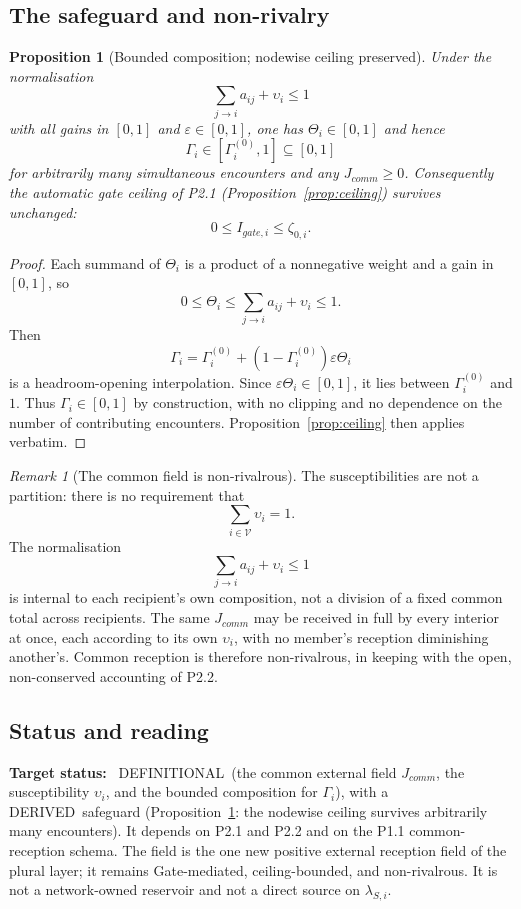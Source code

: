 \documentclass[11pt,a4paper]{article}
\def\mathrm#1{#1}%
\def\emph#1{#1}%
\newcommand{\stDerived}{\textcolor{cDer}{\textsf{\small DERIVED}}}
\newcommand{\stDef}{\textcolor{cDef}{\textsf{\small DEFINITIONAL}}}
\theoremstyle{definition}
\theoremstyle{plain}
\newtheorem{proposition}[definition]{Proposition}
\theoremstyle{remark}
\newtheorem{remark}[definition]{Remark}
\begin{document}
\subsection{The safeguard and non-rivalry}

\begin{proposition}[Bounded composition; nodewise ceiling preserved]\label{prop:safeguard}
Under the normalisation
\[
\sum_{j\to i}a_{ij}+\upsilon_i\le1
\]
with all gains in \([0,1]\) and \(\varepsilon\in[0,1]\), one has
\(\Theta_i\in[0,1]\) and hence
\[
\Gamma_i\in[\Gamma_i^{(0)},1]\subseteq[0,1]
\]
for arbitrarily many simultaneous encounters and any
\(J_{\mathrm{comm}}\ge0\). Consequently the automatic gate ceiling of P2.1
(Proposition~\ref{prop:ceiling}) survives unchanged:
\[
0\le I_{\mathrm{gate},i}\le\zeta_{0,i}.
\]
\end{proposition}

\begin{proof}
Each summand of \(\Theta_i\) is a product of a nonnegative weight and a gain in
\([0,1]\), so
\[
0\le\Theta_i\le\sum_{j\to i}a_{ij}+\upsilon_i\le1.
\]
Then
\[
\Gamma_i
=
\Gamma_i^{(0)}+(1-\Gamma_i^{(0)})\varepsilon\Theta_i
\]
is a headroom-opening interpolation. Since \(\varepsilon\Theta_i\in[0,1]\), it lies
between \(\Gamma_i^{(0)}\) and \(1\). Thus \(\Gamma_i\in[0,1]\) by construction,
with no clipping and no dependence on the number of contributing encounters.
Proposition~\ref{prop:ceiling} then applies verbatim. \qedhere
\end{proof}

\begin{remark}[The common field is non-rivalrous]\label{rem:nonrival}
The susceptibilities are \emph{not} a partition: there is no requirement that
\[
\sum_{i\in\mathcal V}\upsilon_i=1.
\]
The normalisation
\[
\sum_{j\to i}a_{ij}+\upsilon_i\le1
\]
is internal to each recipient's own composition, not a division of a fixed common
total across recipients. The same \(J_{\mathrm{comm}}\) may be received in full by
every interior at once, each according to its own \(\upsilon_i\), with no member's
reception diminishing another's. Common reception is therefore non-rivalrous, in
keeping with the open, non-conserved accounting of P2.2.
\end{remark}

\subsection{Status and reading}

\textbf{Target status:}~
\stDef\ (the common external field \(J_{\mathrm{comm}}\), the susceptibility \(\upsilon_i\), and
the bounded composition for \(\Gamma_i\)), with a \stDerived\ safeguard
(Proposition~\ref{prop:safeguard}: the nodewise ceiling survives arbitrarily many
encounters). It depends on P2.1 and P2.2 and on the P1.1 common-reception schema. The field
is the one new positive external reception field of the plural layer; it
remains Gate-mediated, ceiling-bounded, and non-rivalrous. It is not a
network-owned reservoir and not a direct source on \(\lambda_{S,i}\).
\end{document}

